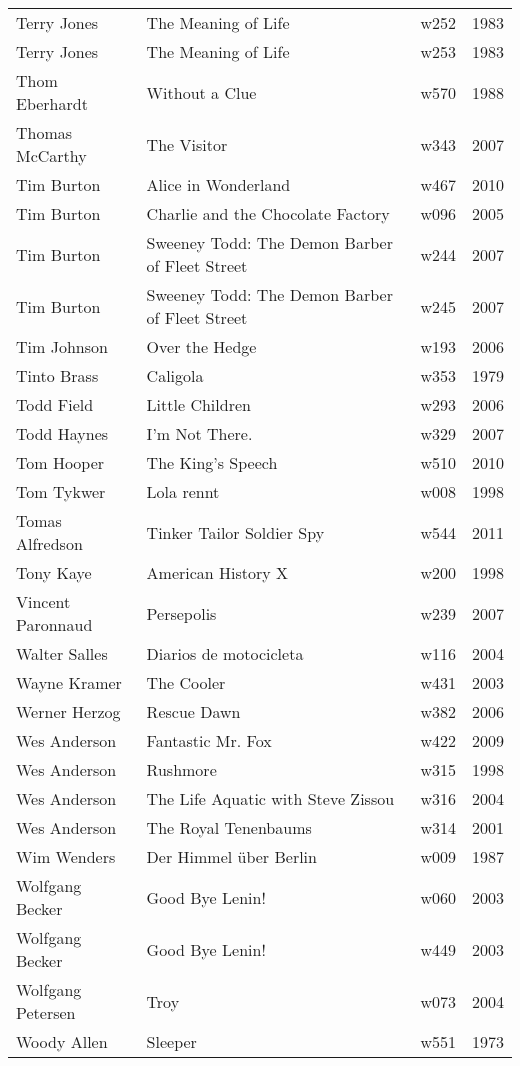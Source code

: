 \documentclass{article}
\begin{document}
\begin {center}
\begin{longtable}{l p{10cm} l l}
Terry Jones & The Meaning of Life & w252 & 1983 \\
Terry Jones & The Meaning of Life & w253 & 1983 \\
Thom Eberhardt & Without a Clue & w570 & 1988 \\
Thomas McCarthy & The Visitor & w343 & 2007 \\
Tim Burton & Alice in Wonderland & w467 & 2010 \\
Tim Burton & Charlie and the Chocolate Factory & w096 & 2005 \\
Tim Burton & Sweeney Todd: The Demon Barber of Fleet Street & w244 & 2007 \\
Tim Burton & Sweeney Todd: The Demon Barber of Fleet Street & w245 & 2007 \\
Tim Johnson & Over the Hedge & w193 & 2006 \\
Tinto Brass & Caligola & w353 & 1979 \\
Todd Field & Little Children & w293 & 2006 \\
Todd Haynes & I'm Not There. & w329 & 2007 \\
Tom Hooper & The King's Speech & w510 & 2010 \\
Tom Tykwer & Lola rennt & w008 & 1998 \\
Tomas Alfredson & Tinker Tailor Soldier Spy & w544 & 2011 \\
Tony Kaye & American History X & w200 & 1998 \\
Vincent Paronnaud & Persepolis & w239 & 2007 \\
Walter Salles & Diarios de motocicleta & w116 & 2004 \\
Wayne Kramer & The Cooler & w431 & 2003 \\
Werner Herzog & Rescue Dawn & w382 & 2006 \\
Wes Anderson & Fantastic Mr. Fox & w422 & 2009 \\
Wes Anderson & Rushmore & w315 & 1998 \\
Wes Anderson & The Life Aquatic with Steve Zissou & w316 & 2004 \\
Wes Anderson & The Royal Tenenbaums & w314 & 2001 \\
Wim Wenders & Der Himmel über Berlin & w009 & 1987 \\
Wolfgang Becker & Good Bye Lenin! & w060 & 2003 \\
Wolfgang Becker & Good Bye Lenin! & w449 & 2003 \\
Wolfgang Petersen & Troy & w073 & 2004 \\
Woody Allen & Sleeper & w551 & 1973 \\

\end{longtable}
\end{center}
\end{document}
